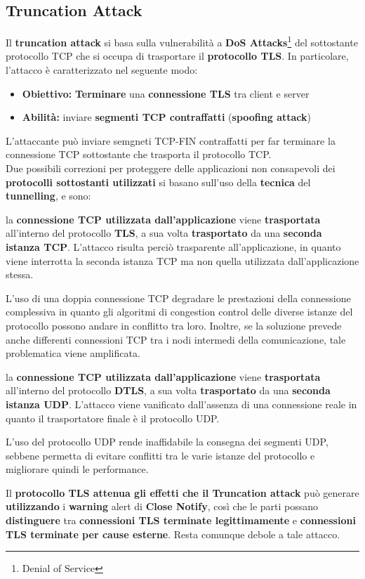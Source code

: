 \subsection{Truncation Attack}
Il \textbf{truncation attack} si basa sulla vulnerabilità a \textbf{DoS Attacks}\footnote{Denial of Service} del sottostante protocollo TCP che si occupa di trasportare il \textbf{protocollo TLS}. In particolare, l'attacco è caratterizzato nel seguente modo:
\begin{itemize}
    \item \textbf{Obiettivo:} \textbf{Terminare} una \textbf{connessione TLS} tra client e server
    \item \textbf{Abilità:} inviare \textbf{segmenti TCP contraffatti} (\textbf{spoofing attack})
\end{itemize}
L'attaccante può inviare semgneti TCP-FIN contraffatti per far terminare la connessione TCP sottostante che trasporta il protocollo TCP.\\
Due possibili correzioni per proteggere delle applicazioni non consapevoli dei \textbf{protocolli sottostanti utilizzati} si basano sull'uso della \textbf{tecnica} del \textbf{tunnelling}, e sono:
\begin{theorem}
la \textbf{connessione TCP utilizzata dall'applicazione} viene \textbf{trasportata} all'interno del protocollo \textbf{TLS}, a sua volta \textbf{trasportato} da una \textbf{seconda istanza TCP}. L'attacco risulta perciò trasparente all'applicazione, in quanto viene interrotta la seconda istanza TCP ma non quella utilizzata dall'applicazione stessa.
\end{theorem}
\begin{note}
L’uso di una doppia connessione TCP degradare le prestazioni della connessione complessiva in quanto gli algoritmi di congestion control delle diverse istanze del protocollo possono andare in conflitto tra loro. Inoltre, se la soluzione prevede anche differenti connessioni TCP tra i nodi intermedi della comunicazione, tale problematica viene amplificata.
\end{note}
\begin{theorem}
la \textbf{connessione TCP utilizzata dall'applicazione} viene \textbf{trasportata} all'interno del protocollo \textbf{DTLS}, a sua volta \textbf{trasportato} da una \textbf{seconda istanza UDP}. L'attacco viene vanificato dall'assenza di una connessione reale in quanto il trasportatore finale è il protocollo UDP.
\end{theorem}
\begin{note}
L’uso del protocollo UDP rende inaffidabile la consegna dei segmenti UDP, sebbene permetta di evitare conflitti tra le varie istanze del protocollo e migliorare quindi le performance.
\end{note}
\begin{remark}
Il \textbf{protocollo TLS attenua gli effetti che il Truncation attack} può generare \textbf{utilizzando} i \textbf{warning} alert di \textbf{Close Notify}, così che le parti possano \textbf{distinguere} tra \textbf{connessioni TLS terminate legittimamente} e \textbf{connessioni TLS terminate per cause esterne}. Resta comunque debole a tale attacco.
\end{remark}
